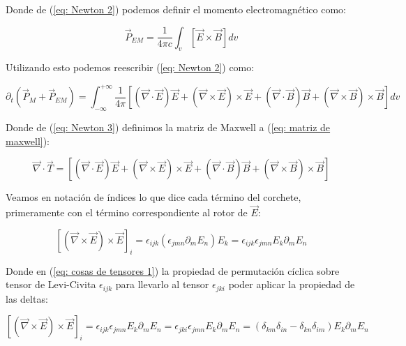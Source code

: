 \documentclass[]{article}
\begin{document}
Donde de (\ref{eq: Newton 2}) podemos definir el momento electromagnético como:

\begin{equation}
    \vec{P}_{EM} =
    \frac{1}{4 \pi c} \int_{v}^{}\left[
    \vec{E} \times \vec{B}
    \right] dv 
\end{equation}

Utilizando esto podemos reescribir (\ref{eq: Newton 2}) como:

\begin{equation}
    \partial_t (\vec{P}_M + \vec{P}_{EM}) =
    \int_{-\infty}^{+\infty} \frac{1}{4 \pi} \left[
    (\vec{\nabla} \cdot \vec{E})\vec{E} + 
    (\vec{\nabla} \times \vec{E}) \times \vec{E} +
    (\vec{\nabla} \cdot \vec{B})\vec{B} +
    (\vec{\nabla} \times \vec{B}) \times \vec{B}
    \right] dv
    \label{eq: Newton 3}
\end{equation}


Donde de (\ref{eq: Newton 3}) definimos la matriz de Maxwell a (\ref{eq: matriz de maxwell}):

\begin{equation}
    \vec{\nabla} \cdot \vec{T} =
    \left[
    (\vec{\nabla} \cdot \vec{E})\vec{E} + 
    (\vec{\nabla} \times \vec{E}) \times \vec{E} +
    (\vec{\nabla} \cdot \vec{B})\vec{B} +
    (\vec{\nabla} \times \vec{B}) \times \vec{B}
    \right]
    \label{eq: matriz de maxwell}
\end{equation}

Veamos en notación de índices lo que dice cada término del corchete, primeramente con el término 
correspondiente al rotor de $\vec{E}$:

\begin{equation}
    \left[
    (\vec{\nabla} \times \vec{E}) \times \vec{E}
    \right]_i =
    \epsilon_{ijk} (\epsilon_{jmn} \partial_m E_n)E_k = 
    \epsilon_{ijk} \epsilon_{jmn} E_k \partial_m E_n
    \label{eq: cosas de tensores 1}
\end{equation}

Donde en (\ref{eq: cosas de tensores 1}) la propiedad de permutación cíclica sobre tensor de Levi-Civita 
$\epsilon_{ijk}$ para llevarlo al tensor $\epsilon_{jki}$ poder aplicar la propiedad de las deltas:

\begin{equation*}
    \left[
    (\vec{\nabla} \times \vec{E}) \times \vec{E}
    \right]_i =
    \epsilon_{ijk} \epsilon_{jmn} E_k \partial_m E_n =
    \epsilon_{jki} \epsilon_{jmn} E_k \partial_m E_n =
    (\delta_{km} \delta_{in} - \delta_{kn} \delta_{im}) E_k \partial_m E_n
    \label{eq: cosas de tensores 2}
\end{equation*}
\end{document}
